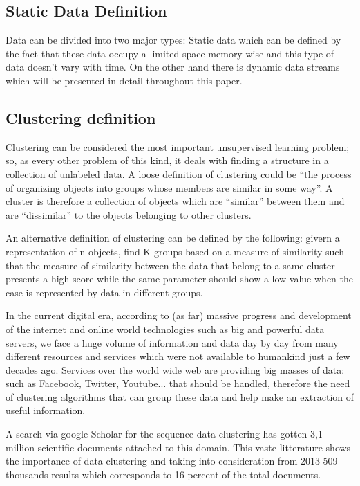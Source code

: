 \documentclass[]{article}
\begin{document}
\subsection{Static Data Definition}
Data can be divided into two major types: Static data which can be defined by the fact that these data occupy a limited space memory wise and this type of data doesn't vary with time. On the other hand there is dynamic data streams which will be presented in detail throughout this paper.
\subsection{Clustering definition}
Clustering can be considered the most important unsupervised learning problem; so, as every other problem of this kind, it deals with finding a structure in a collection of unlabeled data. A loose definition of clustering could be “the process of organizing objects into groups whose members are similar in some way”. A cluster is therefore a collection of objects which are “similar” between them and are “dissimilar” to the objects belonging to other clusters.

An alternative definition of clustering can be defined by the following: givern a representation of n objects, find K groups based on a measure of similarity such that the measure of similarity between the data that belong to a same cluster presents a high score while the same parameter should show a low value when the case is represented by data in different groups.

In the current digital era, according to (as far) massive progress and development of the internet and online world technologies such as big and powerful data servers, we face a huge volume of information and data day by day from many different resources and services which were not available to humankind just a few decades ago. Services over the world wide web are providing big masses of data: such as Facebook, Twitter, Youtube... that should be handled, therefore the need of clustering algorithms that can group these data and help make an extraction of useful information.\cite{fahad2014survey}

A search via google Scholar\cite{gsc} for the sequence data clustering has gotten 3,1 million scientific documents attached to this domain. This vaste litterature shows the importance of data clustering and taking into consideration from 2013 509 thousands results which corresponds to 16 percent of the total documents.
\end{document}
